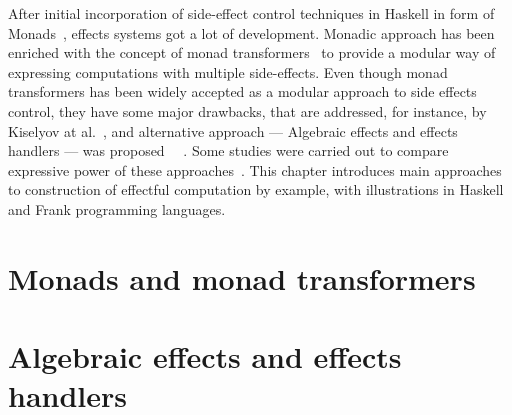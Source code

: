   After initial incorporation of side-effect control techniques in Haskell in
  form of Monads~\cite{Wadler:1992:EFP:143165.143169}, effects systems got a lot
  of development. Monadic approach has been enriched with the concept of monad
  transformers~\cite{Liang:1995:MTM:199448.199528} to provide a modular way of
  expressing computations with multiple side-effects. Even though monad
  transformers has been widely accepted as a modular approach to side effects control,
  they have some major drawbacks, that are addressed, for instance, by Kiselyov at al.~\cite{Kiselyov:2013:EEA:2578854.2503791}, and alternative approach --- Algebraic effects and effects handlers --- was proposed~\cite{DBLP:journals/jlp/BauerP15}
  ~\cite{Kiselyov:2013:EEA:2578854.2503791}. Some studies were carried out to
  compare expressive power of these approaches~\cite{DBLP:journals/corr/ForsterKLP16}.
  This chapter introduces main approaches to construction of effectful computation
  by example, with illustrations in Haskell and Frank programming languages.

  \section{Monads and monad transformers}

  \section{Algebraic effects and effects handlers}
